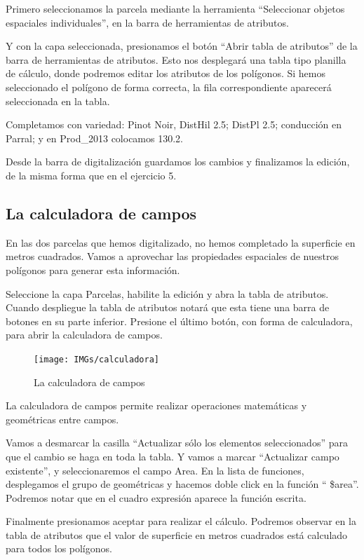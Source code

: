 \documentclass[onecolumn]{article}
\begin{document}
Primero seleccionamos la parcela mediante la herramienta “Seleccionar objetos espaciales individuales”, en la barra de herramientas de atributos.

Y con la capa seleccionada, presionamos el botón “Abrir tabla de atributos” de la barra de herramientas de atributos. Esto nos desplegará una tabla tipo planilla de cálculo, donde podremos editar los atributos de los polígonos. Si hemos seleccionado el polígono de forma correcta, la fila correspondiente aparecerá seleccionada en la tabla.

Completamos con variedad: Pinot Noir, DistHil 2.5; DistPl 2.5; conducción en Parral; y en Prod\_2013 colocamos 130.2.

Desde la barra de digitalización guardamos los cambios y finalizamos la edición, de la misma forma que en el ejercicio 5.

\subsection{La calculadora de campos}

En las dos parcelas que hemos digitalizado, no hemos completado la superficie en metros cuadrados. Vamos a aprovechar las propiedades espaciales de nuestros polígonos para generar esta información. 

Seleccione la capa Parcelas, habilite la edición y abra la tabla de atributos. Cuando despliegue la tabla de atributos notará que esta tiene una barra de botones en su parte inferior. Presione  el último botón, con forma de calculadora, para abrir la calculadora de campos.

\begin{figure}[h]
	\centering
	\texttt{[image: IMGs/calculadora]}
	\caption{La calculadora de campos}
	\label{fig:interfaz}
\end{figure}

La calculadora de campos permite realizar operaciones matemáticas y geométricas entre campos.

Vamos a desmarcar la casilla “Actualizar sólo los elementos seleccionados” para que el cambio se haga en toda la tabla. Y vamos a marcar  “Actualizar campo existente”, y seleccionaremos el campo Area. 
En la lista de funciones, desplegamos el grupo de geométricas y hacemos doble click en la función “ \$area”.
Podremos notar que en el cuadro expresión aparece la función escrita. 

Finalmente presionamos aceptar para realizar el cálculo. Podremos observar en la tabla de atributos que el valor de superficie en metros cuadrados está calculado para todos los polígonos.
\end{document}

